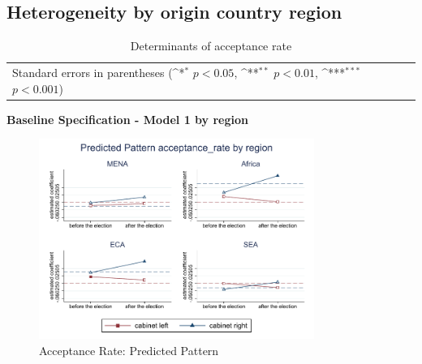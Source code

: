 \documentclass[10pt,a4paper]{scrartcl}
\begin{document}
\clearpage
\FloatBarrier
\subsection{Heterogeneity by origin country region}
\begin{table}[!ht]\centering
	\renewcommand{\arraystretch}{1.25}
	\small
	\def\sym#1{\ifmmode^{#1}\else\(^{#1}\)\fi}
	\caption{Determinants of acceptance rate}
	\begin{tabular}{l*{4}{c}}
		\hline\hline
		
		\hline\hline
		\multicolumn{5}{l}{\footnotesize Standard errors in parentheses (\sym{*} \(p<0.05\), \sym{**} \(p<0.01\), \sym{***} \(p<0.001\))}\\
	\end{tabular}
\end{table}

\clearpage
\textbf{Baseline Specification - Model 1 by region}
\begin{figure}[!ht]
	\centering
	\includegraphics[width=0.8\textwidth]{figures_edited/acceptance_rate_graph1_by_region.pdf}
	\caption{Acceptance Rate: Predicted Pattern}
\end{figure}
\end{document}

